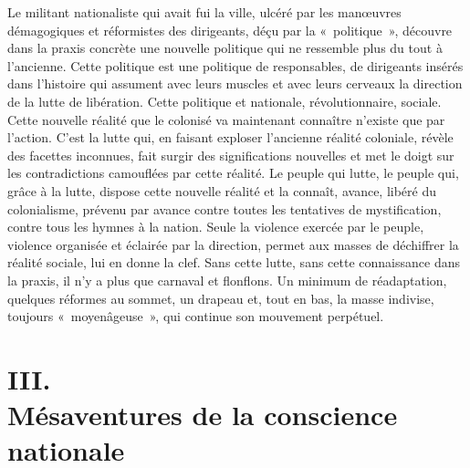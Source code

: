 \documentclass[french,twoside]{book} %
\newcommand\chapteropen{} %
\newcommand\chapterclose{} %
\begin{document}
\noindent Le militant nationaliste qui avait fui la ville, ulcéré par les manœuvres démagogiques et réformistes des dirigeants, déçu par la « politique », découvre dans la praxis concrète une nouvelle politique qui ne ressemble plus du tout à l’ancienne. Cette politique est une politique de responsables, de dirigeants insérés dans l’histoire qui assument avec leurs muscles et avec leurs   cerveaux la direction de la lutte de libération. Cette politique et nationale, révolutionnaire, sociale. Cette nouvelle réalité que le colonisé va maintenant connaître n’existe que par l’action. C’est la lutte qui, en faisant exploser l’ancienne réalité coloniale, révèle des facettes inconnues, fait surgir des significations nouvelles et met le doigt sur les contradictions camouflées par cette réalité. Le peuple qui lutte, le peuple qui, grâce à la lutte, dispose cette nouvelle réalité et la connaît, avance, libéré du colonialisme, prévenu par avance contre toutes les tentatives de mystification, contre tous les hymnes à la nation. Seule la violence exercée par le peuple, violence organisée et éclairée par la direction, permet aux masses de déchiffrer la réalité sociale, lui en donne la clef. Sans cette lutte, sans cette connaissance dans la praxis, il n’y a plus que carnaval et flonflons. Un minimum de réadaptation, quelques réformes au sommet, un drapeau et, tout en bas, la masse indivise, toujours « moyenâgeuse », qui continue son mouvement perpétuel.\par
 \chapterclose


\chapteropen
\chapter[{III. Mésaventures de la conscience nationale}]{III. \\
Mésaventures de la conscience nationale}\renewcommand{\leftmark}{III. \\
Mésaventures de la conscience nationale}
\end{document}
